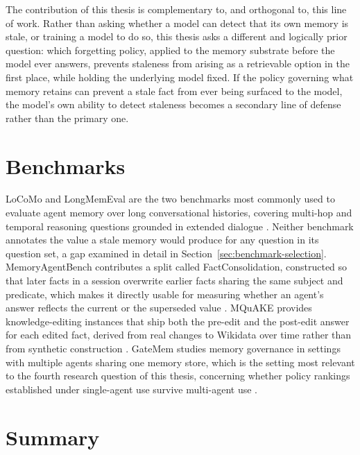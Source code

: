 The contribution of this thesis is complementary to, and orthogonal to, this line of work. Rather than asking whether a model can detect that its own memory is stale, or training a model to do so, this thesis asks a different and logically prior question: which forgetting policy, applied to the memory substrate before the model ever answers, prevents staleness from arising as a retrievable option in the first place, while holding the underlying model fixed. If the policy governing what memory retains can prevent a stale fact from ever being surfaced to the model, the model's own ability to detect staleness becomes a secondary line of defense rather than the primary one.

\section{Benchmarks}
\label{sec:related-benchmarks}

LoCoMo and LongMemEval are the two benchmarks most commonly used to evaluate agent memory over long conversational histories, covering multi-hop and temporal reasoning questions grounded in extended dialogue \citep{maharana2024locomo,wu2025longmemeval}. Neither benchmark annotates the value a stale memory would produce for any question in its question set, a gap examined in detail in Section~\ref{sec:benchmark-selection}. MemoryAgentBench contributes a split called FactConsolidation, constructed so that later facts in a session overwrite earlier facts sharing the same subject and predicate, which makes it directly usable for measuring whether an agent's answer reflects the current or the superseded value \citep{hu2026memoryagentbench}. MQuAKE provides knowledge-editing instances that ship both the pre-edit and the post-edit answer for each edited fact, derived from real changes to Wikidata over time rather than from synthetic construction \citep{zhong2023mquake}. GateMem studies memory governance in settings with multiple agents sharing one memory store, which is the setting most relevant to the fourth research question of this thesis, concerning whether policy rankings established under single-agent use survive multi-agent use \citep{ren2026gatemem}.

\section{Summary}
\label{sec:related-summary}

